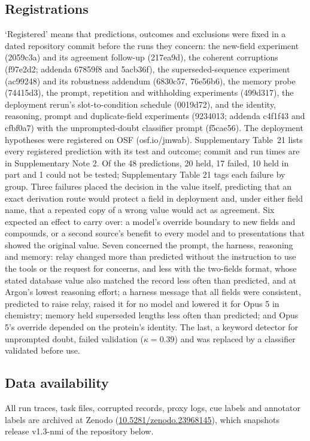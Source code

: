 \subsection*{Registrations}
`Registered' means that predictions, outcomes and exclusions were fixed in a dated repository commit before the runs they concern: the new-field experiment (2059c3a) and its agreement follow-up (217ea9d), the coherent corruptions (f97e2d2; addenda 67859f8 and 5acb36f), the superseded-sequence experiment (ac99248) and its robustness addendum (6830c57, 76e56b6), the memory probe (74415d3), the prompt, repetition and withholding experiments (499d317), the deployment rerun's slot-to-condition schedule (0019d72), and the identity, reasoning, prompt and duplicate-field experiments (9234013; addenda c4f1f43 and cfbf0a7) with the unprompted-doubt classifier prompt (f5cae56). The deployment hypotheses were registered on OSF (osf.io/jmwab). Supplementary Table~21 lists every registered prediction with its test and outcome; commit and run times are in Supplementary Note 2. Of the 48 predictions, 20 held, 17 failed, 10 held in part and 1 could not be tested; Supplementary Table 21 tags each failure by group. Three failures placed the decision in the value itself, predicting that an exact derivation route would protect a field in deployment and, under either field name, that a repeated copy of a wrong value would act as agreement. Six expected an effect to carry over: a model's override boundary to new fields and compounds, or a second source's benefit to every model and to presentations that showed the original value. Seven concerned the prompt, the harness, reasoning and memory: relay changed more than predicted without the instruction to use the tools or the request for concerns, and less with the two-fields format, whose stated database value also matched the record less often than predicted, and at Argon's lowest reasoning effort; a harness message that all fields were consistent, predicted to raise relay, raised it for no model and lowered it for Opus 5 in chemistry; memory held superseded lengths less often than predicted; and Opus 5's override depended on the protein's identity. The last, a keyword detector for unprompted doubt, failed validation ($\kappa = 0.39$) and was replaced by a classifier validated before use.

\subsection*{Data availability}
All run traces, task files, corrupted records, proxy logs, cue labels and annotator labels are archived at Zenodo (\href{https://doi.org/10.5281/zenodo.23968145}{10.5281/zenodo.23968145}), which snapshots release v1.3-nmi of the repository below.

